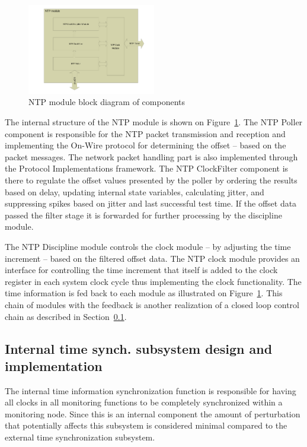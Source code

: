 \documentclass[article]{IEEEtran}
\begin{document}
\begin{figure}[!htb]
    \centering
    \includegraphics[width=0.5\textwidth]{figures_raw/ntp-sketch.pdf}
    \caption{NTP module block diagram of components}
    \label{fig:ntp-impl}
\end{figure}

The internal structure of the NTP module is shown on Figure~\ref{fig:ntp-impl}. The NTP Poller component is responsible
for the NTP packet transmission and reception and implementing the On-Wire protocol
for determining the offset  -- based on the packet messages. The network packet handling part is also implemented
through the Protocol Implementations framework. The NTP ClockFilter component is there to regulate the offset values
presented by the poller by ordering the results based on delay, updating internal state variables, calculating jitter,
and
suppressing spikes based on jitter and last successful test time. If the offset data passed the filter stage it is
forwarded for further processing by the discipline module.

The NTP Discipline module controls the clock module -- by adjusting the time increment -- based on the filtered offset
data. The NTP clock module provides an interface for controlling the time increment that itself is added to the clock
register in each system clock cycle thus
implementing the clock functionality. The time information is fed back to each module as illustrated on
Figure~\ref{fig:ntp-impl}.
This chain of modules with the feedback is another realization of a closed loop control chain as described in
Section~\ref{sec:Internal-Impl}.

\subsection{Internal time synch. subsystem design and implementation}\label{sec:Internal-Impl}

The internal time information synchronization function is responsible for having all clocks in all monitoring functions
to be completely synchronized within a monitoring node. Since this is an internal component the amount of perturbation
that potentially affects this subsystem is considered minimal compared to the external time synchronization subsystem.
\end{document}
